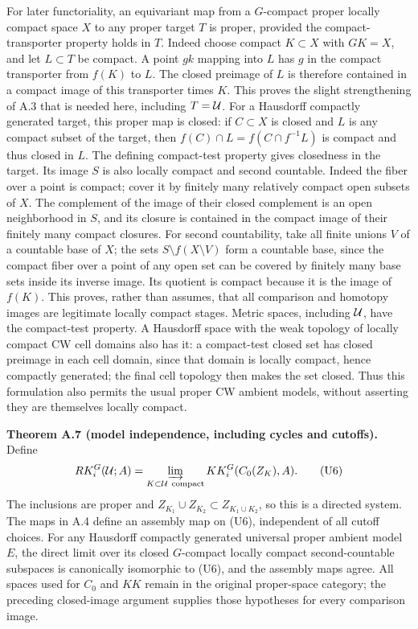 \documentclass[
  11pt,
]{article}
\begin{document}
For later functoriality, an equivariant map from a \(G\)-compact proper
locally compact space \(X\) to any proper target \(T\) is proper,
provided the compact-transporter property holds in \(T\). Indeed choose
compact \(K\subset X\) with \(GK=X\), and let \(L\subset T\) be compact.
A point \(gk\) mapping into \(L\) has \(g\) in the compact transporter
from \(f(K)\) to \(L\). The closed preimage of \(L\) is therefore
contained in a compact image of this transporter times \(K\). This
proves the slight strengthening of A.3 that is needed here, including
\(T={\cal U}\). For a Hausdorff compactly generated target, this proper
map is closed: if \(C\subset X\) is closed and \(L\) is any compact
subset of the target, then \(f(C)\cap L=f(C\cap f^{-1}L)\) is compact
and thus closed in \(L\). The defining compact-test property gives
closedness in the target. Its image \(S\) is also locally compact and
second countable. Indeed the fiber over a point is compact; cover it by
finitely many relatively compact open subsets of \(X\). The complement
of the image of their closed complement is an open neighborhood in
\(S\), and its closure is contained in the compact image of their
finitely many compact closures. For second countability, take all finite
unions \(V\) of a countable base of \(X\); the sets
\(S\setminus f(X\setminus V)\) form a countable base, since the compact
fiber over a point of any open set can be covered by finitely many base
sets inside its inverse image. Its quotient is compact because it is the
image of \(f(K)\). This proves, rather than assumes, that all comparison
and homotopy images are legitimate locally compact stages. Metric
spaces, including \({\cal U}\), have the compact-test property. A
Hausdorff space with the weak topology of locally compact CW cell
domains also has it: a compact-test closed set has closed preimage in
each cell domain, since that domain is locally compact, hence compactly
generated; the final cell topology then makes the set closed. Thus this
formulation also permits the usual proper CW ambient models, without
asserting they are themselves locally compact.

\textbf{Theorem A.7 (model independence, including cycles and cutoffs).}
Define \[
 RK^G_i({\cal U};A)
   =\varinjlim_{K\subset{\cal U}\ {\rm compact}}
       KK^G_i(C_0(Z_K),A).
 \tag{U6}
\] The inclusions are proper and
\(Z_{K_1}\cup Z_{K_2}\subset Z_{K_1\cup K_2}\), so this is a directed
system. The maps in A.4 define an assembly map on (U6), independent of
all cutoff choices. For any Hausdorff compactly generated universal
proper ambient model \(E\), the direct limit over its closed
\(G\)-compact locally compact second-countable subspaces is canonically
isomorphic to (U6), and the assembly maps agree. All spaces used for
\(C_0\) and \(KK\) remain in the original proper-space category; the
preceding closed-image argument supplies those hypotheses for every
comparison image.
\end{document}
